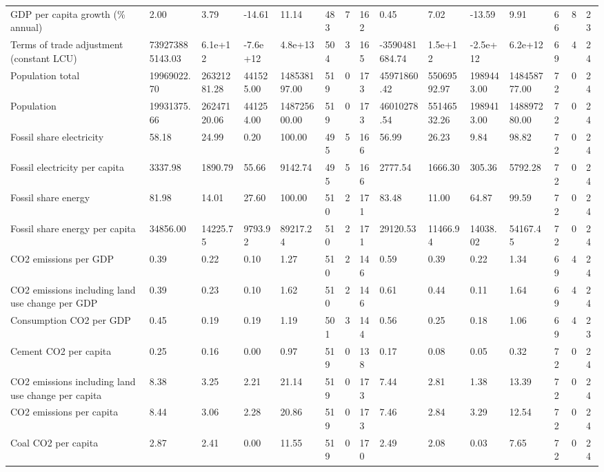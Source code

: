 \begin{longtable}{lllllllllllllll}
GDP per capita growth (\% annual) & 2.00 & 3.79 & -14.61 & 11.14 & 483 & 7 & 162 & 0.45 & 7.02 & -13.59 & 9.91 & 66 & 8 & 23\\
\addlinespace
Terms of trade adjustment (constant LCU) & 739273885143.03 & 6.1e+12 & -7.6e+12 & 4.8e+13 & 504 & 3 & 165 & -3590481684.74 & 1.5e+12 & -2.5e+12 & 6.2e+12 & 69 & 4 & 24\\
Population total & 19969022.70 & 26321281.28 & 441525.00 & 148538197.00 & 519 & 0 & 173 & 45971860.42 & 55069592.97 & 1989443.00 & 148458777.00 & 72 & 0 & 24\\
Population & 19931375.66 & 26247120.06 & 441254.00 & 148725600.00 & 519 & 0 & 173 & 46010278.54 & 55146532.26 & 1989413.00 & 148897280.00 & 72 & 0 & 24\\
Fossil share electricity & 58.18 & 24.99 & 0.20 & 100.00 & 495 & 5 & 166 & 56.99 & 26.23 & 9.84 & 98.82 & 72 & 0 & 24\\
Fossil electricity per capita & 3337.98 & 1890.79 & 55.66 & 9142.74 & 495 & 5 & 166 & 2777.54 & 1666.30 & 305.36 & 5792.28 & 72 & 0 & 24\\
\addlinespace
Fossil share energy & 81.98 & 14.01 & 27.60 & 100.00 & 510 & 2 & 171 & 83.48 & 11.00 & 64.87 & 99.59 & 72 & 0 & 24\\
Fossil share energy per capita & 34856.00 & 14225.75 & 9793.92 & 89217.24 & 510 & 2 & 171 & 29120.53 & 11466.94 & 14038.02 & 54167.45 & 72 & 0 & 24\\
CO2 emissions per GDP & 0.39 & 0.22 & 0.10 & 1.27 & 510 & 2 & 146 & 0.59 & 0.39 & 0.22 & 1.34 & 69 & 4 & 24\\
CO2 emissions including land use change per GDP & 0.39 & 0.23 & 0.10 & 1.62 & 510 & 2 & 146 & 0.61 & 0.44 & 0.11 & 1.64 & 69 & 4 & 24\\
Consumption CO2 per GDP & 0.45 & 0.19 & 0.19 & 1.19 & 501 & 3 & 144 & 0.56 & 0.25 & 0.18 & 1.06 & 69 & 4 & 23\\
\addlinespace
Cement CO2 per capita & 0.25 & 0.16 & 0.00 & 0.97 & 519 & 0 & 138 & 0.17 & 0.08 & 0.05 & 0.32 & 72 & 0 & 24\\
CO2 emissions including land use change per capita & 8.38 & 3.25 & 2.21 & 21.14 & 519 & 0 & 173 & 7.44 & 2.81 & 1.38 & 13.39 & 72 & 0 & 24\\
CO2 emissions per capita & 8.44 & 3.06 & 2.28 & 20.86 & 519 & 0 & 173 & 7.46 & 2.84 & 3.29 & 12.54 & 72 & 0 & 24\\
Coal CO2 per capita & 2.87 & 2.41 & 0.00 & 11.55 & 519 & 0 & 170 & 2.49 & 2.08 & 0.03 & 7.65 & 72 & 0 & 24\\

\end{longtable}
